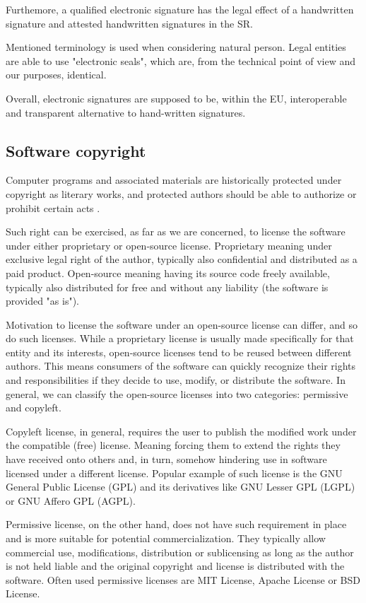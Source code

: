 \documentclass[thesismargins, english, thesislinespacing, twoside, openright, upjsfrontpage]{rnthesis}
\begin{document}
Furthemore, a qualified electronic signature has the legal effect of a handwritten signature \cite{eidas} and attested handwritten signatures in the SR.

Mentioned terminology is used when considering natural person. Legal entities are able to use "electronic seals", which are, from the technical point of view and our purposes, identical.

Overall, electronic signatures are supposed to be, within the EU, interoperable and transparent alternative to hand-written signatures.

\subsection{Software copyright}

Computer programs and associated materials are historically protected under copyright as literary works, and protected authors should be able to authorize or prohibit certain acts \cite{eeccopyright}.

Such right can be exercised, as far as we are concerned, to license the software under either proprietary or open-source license.
Proprietary meaning under exclusive legal right of the author, typically also confidential and distributed as a paid product.
Open-source meaning having its source code freely available, typically also distributed for free and without any liability (the software is provided "as is").

Motivation to license the software under an open-source license can differ, and so do such licenses.
While a proprietary license is usually made specifically for that entity and its interests, open-source licenses tend to be reused between different authors.
This means consumers of the software can quickly recognize their rights and responsibilities if they decide to use, modify, or distribute the software.
In general, we can classify the open-source licenses into two categories: permissive and copyleft.

Copyleft license, in general, requires the user to publish the modified work under the compatible (free) license.
Meaning forcing them to extend the rights they have received onto others and, in turn, somehow hindering use in software licensed under a different license.
Popular example of such license is the GNU General Public License (GPL) and its derivatives like GNU Lesser GPL (LGPL) or GNU Affero GPL (AGPL).

Permissive license, on the other hand, does not have such requirement in place and is more suitable for potential commercialization.
They typically allow commercial use, modifications, distribution or sublicensing as long as the author is not held liable and the original copyright and license is distributed with the software.
Often used permissive licenses are MIT License, Apache License or BSD License.
\end{document}

